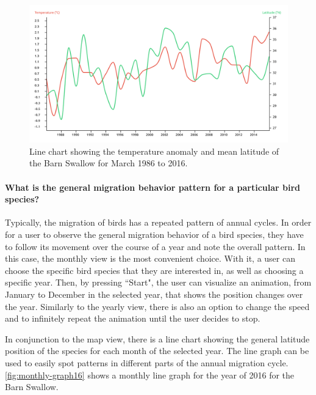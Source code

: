 \documentclass[journal]{vgtc}                %
\begin{document}
\begin{figure}[t]
  \centering
  \includegraphics[width=\linewidth]{march86-16-graph-barnswallow}
  \caption{Line chart showing the temperature anomaly and mean latitude of the Barn Swallow for March 1986 to 2016.}
  \label{fig:march86-16-graph}
\end{figure}

\paragraph{What is the general migration behavior pattern for a particular bird species?}

Typically, the migration of birds has a repeated pattern of annual cycles. In order for a user to observe the general migration behavior of a bird species, they have to follow its movement over the course of a year and note the overall pattern. In this case, the monthly view is the most convenient choice. With it, a user can choose the specific bird species that they are interested in, as well as choosing a specific year. Then, by pressing ``Start", the user can visualize an animation, from January to December in the selected year, that shows the position changes over the year. Similarly to the yearly view, there is also an option to change the speed and to infinitely repeat the animation until the user decides to stop.

In conjunction to the map view, there is a line chart showing the general latitude position of the species for each month of the selected year. The line graph can be used to easily spot patterns in different parts of the annual migration cycle. \autoref{fig:monthly-graph16} shows a monthly line graph for the year of 2016 for the Barn Swallow.
\end{document}
